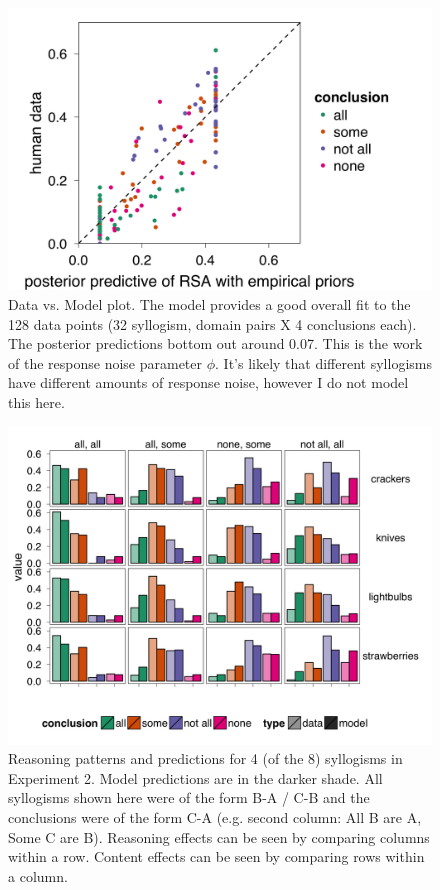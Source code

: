 \documentclass{llncs} %
\begin{document}
\begin{figure}
\centering
    \includegraphics[width=0.5\columnwidth]{figures/scatterplot}
    \caption{Data vs. Model plot. The model provides a good overall fit to the 128 data points (32 syllogism, domain pairs X 4 conclusions each). The posterior predictions bottom out around 0.07. This is the work of the response noise parameter $\phi$. It's likely that different syllogisms have different amounts of response noise, however I do not model this here.}
  \label{fig:scatterplot}
\end{figure}

\begin{figure}
\centering
    \includegraphics[width=\columnwidth]{figures/syllogismXdomain}
    \caption{Reasoning patterns and predictions for 4 (of the 8) syllogisms in Experiment 2. Model predictions are in the darker shade. All syllogisms shown here were of the form B-A / C-B and the conclusions were of the form C-A (e.g. second column: All B are A, Some C are B). Reasoning effects can be seen by comparing columns within a row. Content effects can be seen by comparing rows within a column.}
  \label{fig:syllogismXdomain}
\end{figure}
\end{document}
